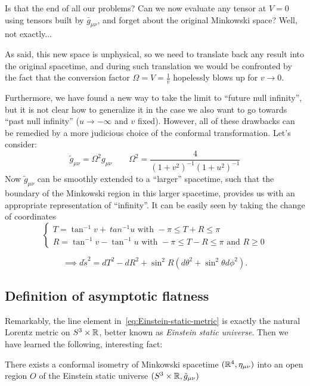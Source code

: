 Is that the end of all our problems? Can we now evaluate any tensor at \(V = 0\) using tensors built by \(\bar{g}_{\mu\nu}\), and forget about the original Minkowski space?
Well, not exactly...

\noindent As said, this new space is unphysical, so we need to translate back any result into the original spacetime, and during such translation we would be confronted by the fact that the conversion factor \(\Omega = V= \frac{1}{v}\) hopelessly blows up for \(v \rightarrow 0\).

Furthermore, we have found a new way to take the limit to ``future null infinity'', but it is not clear how to generalize it in the case we also want to go towards ``past null infinity'' (\(u \rightarrow -\infty\) and \(v\) fixed). However, all of these drawbacks can be remedied by a more judicious choice of the conformal transformation. Let's consider:
\[
\tilde{g}_{\mu\nu} = \Omega^2 g_{\mu\nu} \quad\quad \Omega^2 = \frac{4}{(1 + v^2)^{-1}(1 + u^2)^{-1}} 
\]
Now \(\tilde{g}_{\mu\nu}\) can be smoothly extended to a ``larger'' spacetime, such that the boundary of the Minkowski region in this larger spacetime, provides us with an appropriate representation of ``infinity''.
It can be easily seen by taking the change of coordinates
\[
\begin{cases}
T = \tan^{-1}v +\ tan^{-1}u \text{ with } -\pi \le T + R \le \pi\\
R = \tan^{-1}v - \tan^{-1}u \text{ with } -\pi \le T - R \le \pi \text{ and } R \ge 0
\end{cases}
\]

\begin{equation}
\label{eq:Einstein-static-metric}
	\implies
	d\tilde{s}^2 = dT^2 - dR^2 + \sin^2R(d\theta^2 + \sin^2\theta d\phi^2).
\end{equation}

\subsection{Definition of asymptotic flatness}
Remarkably, the line element in~\eqref{eq:Einstein-static-metric} is exactly the natural Lorentz metric on \(S^3 \times {\mathbb{R}}\), better known as \emph{Einstein static universe}. Then we have learned the following, interesting fact:
\begin{prop}
	There exists a conformal isometry of Minkowski spacetime \(({\mathbb{R}}^4, \eta_{\mu\nu})\) into an open region \(O\) of the Einstein static universe \((S^3 \times {\mathbb{R}}, \tilde{g}_{\mu\nu})\)
\end{prop}

